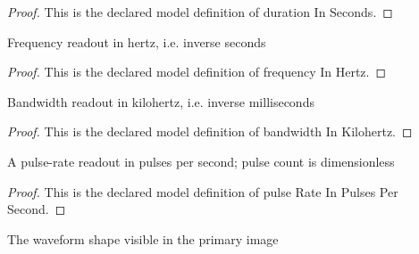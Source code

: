 \begin{proof}
  This is the declared model definition of duration In Seconds.
\end{proof}
\begin{definition}
  \label{def:physics:phyx-mini-0504:phyxminiproblems-problemphyxmini0504-frequencyinhertz}
  Frequency readout in hertz, i.e. inverse seconds
\end{definition}
\begin{proof}
  This is the declared model definition of frequency In Hertz.
\end{proof}
\begin{definition}
  \label{def:physics:phyx-mini-0504:phyxminiproblems-problemphyxmini0504-bandwidthinkilohertz}
  Bandwidth readout in kilohertz, i.e. inverse milliseconds
\end{definition}
\begin{proof}
  This is the declared model definition of bandwidth In Kilohertz.
\end{proof}
\begin{definition}
  \label{def:physics:phyx-mini-0504:phyxminiproblems-problemphyxmini0504-pulserateinpulsespersecond}
  A pulse-rate readout in pulses per second; pulse count is dimensionless
\end{definition}
\begin{proof}
  This is the declared model definition of pulse Rate In Pulses Per Second.
\end{proof}
\begin{definition}
  \label{def:physics:phyx-mini-0504:phyxminiproblems-problemphyxmini0504-pulsetrainshape}
  The waveform shape visible in the primary image
\end{definition}
